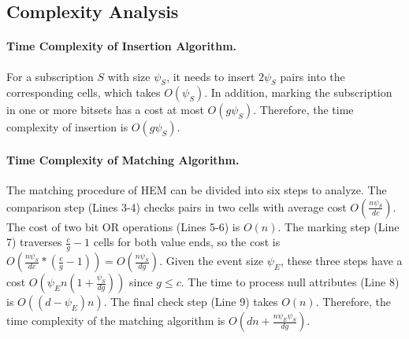 \documentclass[runningheads]{llncs}
\begin{document}
\subsection{Complexity Analysis}


\paragraph{Time Complexity of Insertion Algorithm.} For a subscription $S$ with size $\psi_S$,  it needs to insert $2\psi_S$ pairs into the corresponding cells, which takes $O(\psi_S)$. In addition, marking the subscription in one or more bitsets has a cost at most $O(g\psi_S)$. Therefore, the time complexity of insertion is $O(g\psi_S)$.

\paragraph{Time Complexity of Matching Algorithm.} The matching procedure of HEM can be divided into six steps to analyze. 
The comparison step (Lines 3-4) checks pairs in two cells with average cost $O(\frac{n\psi_S}{dc})$. 
The cost of two bit OR operations (Lines 5-6) is $O(n)$.
The marking step (Line 7) traverses $\frac{c}{g}-1$ cells for both value ends, so the cost is $O(\frac{n\psi_S}{dc}*(\frac{c}{g}-1))=O(\frac{n\psi_S}{dg})$. Given the event size $\psi_E$, these three steps have a cost $O(\psi_En(1+\frac{\psi_S}{dg}))$ since $g\le c$. The time to process null attributes (Line 8) is $O((d-\psi_E)n)$. The final check step (Line 9) takes $O(n)$. Therefore, the time complexity of the matching algorithm is $O(dn+\frac{n\psi_E\psi_S}{dg})$. 
\end{document}
